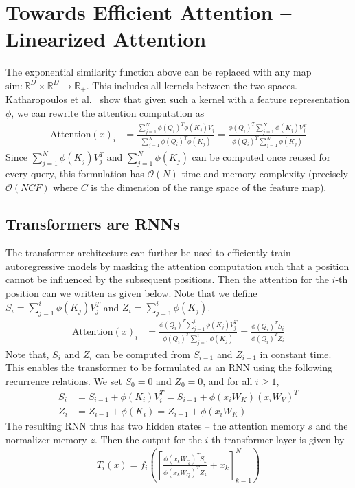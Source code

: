 \documentclass{article}
\newcommand{\R}{\mathbb{R}}
\begin{document}
    \section{Towards Efficient Attention -- Linearized Attention} \label{transformersRNNs}
    The exponential similarity function above can be replaced with any map $\text{sim}: \R^D \times \R^D \to \R_+$. This includes all kernels between the two spaces. Katharopoulos et al.~\cite{transformersRNN} show that given such a kernel with a feature representation $\phi$, we can rewrite the attention computation as
    \begin{align*}
        \text{Attention}(x)_i &= \frac{\sum_{j=1}^N \phi(Q_i)^T\phi(K_j)V_j}{\sum_{j=1}^N \phi(Q_i)^T\phi(K_j)} = \frac{\phi(Q_i)^T\sum_{j=1}^N \phi(K_j)V_j^T}{ \phi(Q_i)^T \sum_{j=1}^N \phi(K_j)}
    \end{align*}
    Since $\sum_{j=1}^N \phi(K_j)V_j^T$ and $\sum_{j=1}^N \phi(K_j)$ can be computed once reused for every query, this formulation has $\mathcal{O}(N)$ time and memory complexity (precisely $\mathcal{O}(NCF)$ where $C$ is the dimension of the range space of the feature map). 
\subsection{Transformers are RNNs}
The transformer architecture can further be used to efficiently train autoregressive models by masking the attention computation such that a position cannot be influenced by the subsequent positions. Then the attention for the $i$-th position can we written as given below. Note that we define $S_i = \sum_{j=1}^i \phi(K_j)V_j^T$ and $Z_i = \sum_{j=1}^i \phi(K_j)$. 
\begin{align*}
    \text{Attention}(x)_i &= \frac{\phi(Q_i)^T\sum_{j=1}^i \phi(K_j)V_j^T}{ \phi(Q_i)^T \sum_{j=1}^i \phi(K_j)} = \frac{\phi(Q_i)^TS_i}{\phi(Q_i)^TZ_i}
\end{align*}
Note that, $S_i$ and $Z_i$ can be computed from $S_{i-1}$ and $Z_{i-1}$ in constant time. This enables the transformer to be formulated as an RNN using the following recurrence relations. We set $S_0 = 0$ and $Z_0 = 0$, and for all $i \ge 1$,
\begin{align*}
    S_i &= S_{i-1} + \phi(K_i)V_i^T = S_{i-1} + \phi(x_iW_K)(x_iW_V)^T \\
    Z_i &= Z_{i-1} + \phi(K_i) = Z_{i-1} + \phi(x_iW_K)
\end{align*}
The resulting RNN thus has two hidden states -- the attention memory $s$ and the normalizer memory $z$. Then the output for the $i$-th transformer layer is given by
\begin{align*}
    T_i(x)=f_i \left( \left[ \frac{\phi(x_kW_Q)^TS_k}{\phi(x_kW_Q)^TZ_k} + x_k \right]_{k=1}^N \right)
\end{align*}
\end{document}
